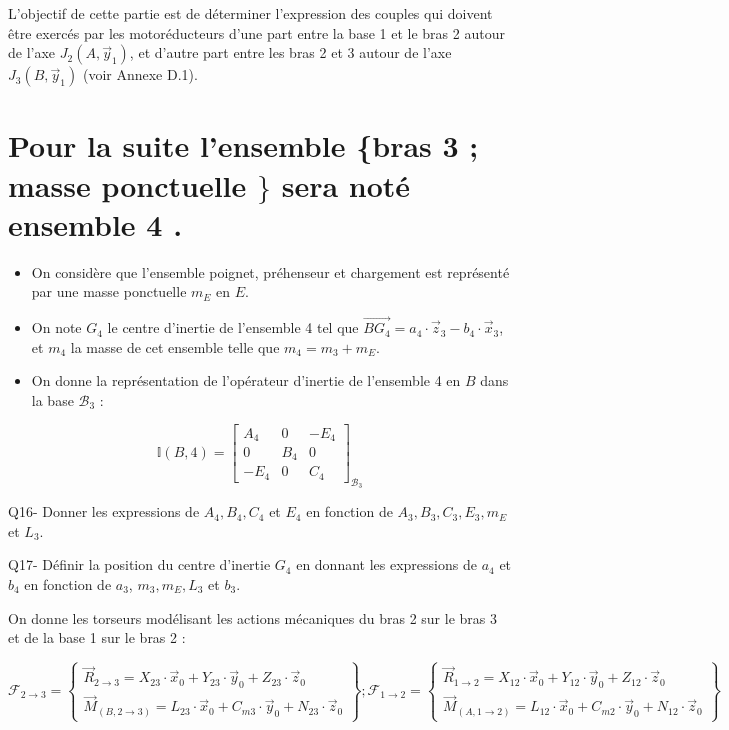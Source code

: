 \documentclass[10pt]{article}
\begin{document}
L'objectif de cette partie est de déterminer l'expression des couples qui doivent être exercés par les motoréducteurs d'une part entre la base 1 et le bras 2 autour de l'axe $J_{2}\left(A, \vec{y}_{1}\right)$, et d'autre part entre les bras 2 et 3 autour de l'axe $J_{3}\left(B, \vec{y}_{1}\right)$ (voir Annexe D.1).

\section*{Pour la suite l'ensemble \{bras 3 ; masse ponctuelle $\}$ sera noté ensemble 4 .}
\begin{itemize}
  \item On considère que l'ensemble poignet, préhenseur et chargement est représenté par une masse ponctuelle $m_{E}$ en $E$.

  \item On note $G_{4}$ le centre d'inertie de l'ensemble 4 tel que $\overrightarrow{B G_{4}}=a_{4} \cdot \vec{z}_{3}-b_{4} \cdot \vec{x}_{3}$, et $m_{4}$ la masse de cet ensemble telle que $m_{4}=m_{3}+m_{E}$.

  \item On donne la représentation de l'opérateur d'inertie de l'ensemble 4 en $B$ dans la base $\mathcal{B}_{3}$ :

\end{itemize}

$$
\mathbb{I}(B, 4)=\left[\begin{array}{ccc}
A_{4} & 0 & -E_{4} \\
0 & B_{4} & 0 \\
-E_{4} & 0 & C_{4}
\end{array}\right]_{\mathcal{B}_{3}}
$$

Q16- Donner les expressions de $A_{4}, B_{4}, C_{4}$ et $E_{4}$ en fonction de $A_{3}, B_{3}, C_{3}, E_{3}, m_{E}$ et $L_{3}$.

Q17- Définir la position du centre d'inertie $G_{4}$ en donnant les expressions de $a_{4}$ et $b_{4}$ en fonction de $a_{3}$, $m_{3}, m_{E}, L_{3}$ et $b_{3}$.

On donne les torseurs modélisant les actions mécaniques du bras 2 sur le bras 3 et de la base 1 sur le bras 2 :

$\mathscr{F}_{2 \rightarrow 3}=\left\{\begin{array}{c}\vec{R}_{2 \rightarrow 3}=X_{23} \cdot \vec{x}_{0}+Y_{23} \cdot \vec{y}_{0}+Z_{23} \cdot \vec{z}_{0} \\ \vec{M}_{(B, 2 \rightarrow 3)}=L_{23} \cdot \vec{x}_{0}+C_{m 3} \cdot \vec{y}_{0}+N_{23} \cdot \vec{z}_{0}\end{array}\right\} ; \mathscr{F}_{1 \rightarrow 2}=\left\{\begin{array}{c}\vec{R}_{1 \rightarrow 2}=X_{12} \cdot \vec{x}_{0}+Y_{12} \cdot \vec{y}_{0}+Z_{12} \cdot \vec{z}_{0} \\ \vec{M}_{(A, 1 \rightarrow 2)}=L_{12} \cdot \vec{x}_{0}+C_{m 2} \cdot \vec{y}_{0}+N_{12} \cdot \vec{z}_{0}\end{array}\right\}$
\end{document}
